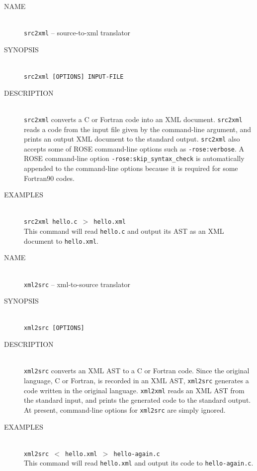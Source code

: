 \begin{framed}
\begin{description}
 \item[NAME]~\\
	    \texttt{src2xml} -- source-to-xml translator

 \item[SYNOPSIS]~\\
	    \texttt{src2xml [OPTIONS] INPUT-FILE}

 \item[DESCRIPTION]~\\ \texttt{src2xml} converts a C or Fortran code
	    into an XML document. \texttt{src2xml} reads a code from the
	    input file given by the command-line argument, and prints
	    an output XML document to the standard
	    output. \texttt{src2xml} also accepts some of ROSE
	    command-line options such as \texttt{-rose:verbose}. A ROSE
	    command-line option \texttt{-rose:skip\_syntax\_check} is
	    automatically appended to the command-line options because
	    it is required for some Fortran90 codes.

 \item[EXAMPLES]~\\ \texttt{src2xml hello.c $>$ hello.xml}\\ This command
	    will read \texttt{hello.c} and output its AST as an XML
	    document to \texttt{hello.xml}.
\end{description}
\end{framed}

\begin{framed}
\begin{description}
 \item[NAME]~\\
	    \texttt{xml2src} -- xml-to-source translator

 \item[SYNOPSIS]~\\
	    \texttt{xml2src [OPTIONS]}

 \item[DESCRIPTION]~\\ \texttt{xml2src} converts an XML AST to a C or
	    Fortran code. Since the original language, C or Fortran, is
	    recorded in an XML AST, \texttt{xml2src} generates a code
	    written in the original language. \texttt{xml2xml} reads an
	    XML AST from the standard input, and prints the generated
	    code to the standard output. At present, command-line
	    options for \texttt{xml2src} are simply ignored.

 \item[EXAMPLES]~\\ \texttt{xml2src $<$ hello.xml $>$ hello-again.c}\\
	    This command will read \texttt{hello.xml} and output its
	    code to \texttt{hello-again.c}.
\end{description}
\end{framed}

